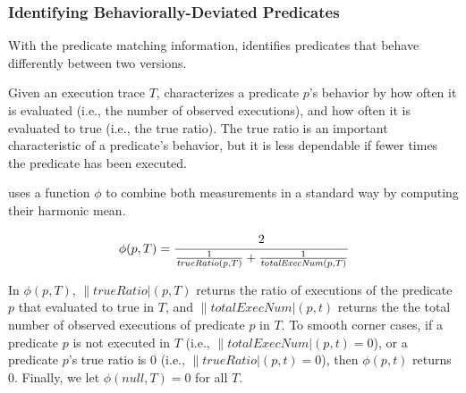 %

\subsubsection{Identifying Behaviorally-Deviated Predicates}
\label{sec:identify_diff}

With the predicate matching information, \ourtool 
identifies predicates that behave differently
between two versions. 

Given an execution trace $\mathit{T}$,
\ourtool characterizes a predicate $\mathit{p}$'s behavior by how often
it is evaluated (i.e., the number of observed executions),
and how often it is evaluated to true (i.e., the true ratio).
The true ratio is an important characteristic of a predicate's behavior,
but it is less dependable
if fewer times the predicate has been executed.

\ourtool uses a function $\phi$ to combine both measurements
in a standard way by computing their harmonic mean.


\vspace{-2mm}

\begin{equation*}
 \|\phi|(p, T)= \cfrac{2}{\frac{1}{\|trueRatio|(p, T)} + \frac{1}{\|totalExecNum|(p, T)}}
\end{equation*}

\vspace{-1mm}

In $\phi(p, T)$, $\|trueRatio|(p, T)$ returns the ratio of executions of the
predicate $p$ that evaluated to true in $T$,
and $\|totalExecNum|(p, t)$ returns the the total
number of observed executions of predicate $p$ in $T$.
To smooth corner cases, if a predicate $p$ is not executed in $T$ 
(i.e., $\|totalExecNum|(p, t) = 0$), or
a predicate $p$'s true ratio is 0 (i.e., $\|trueRatio|(p, t) = 0$),
then $\phi(p, t)$ returns 0.
Finally, we let $\phi(null, T) = 0$ for all $T$.


